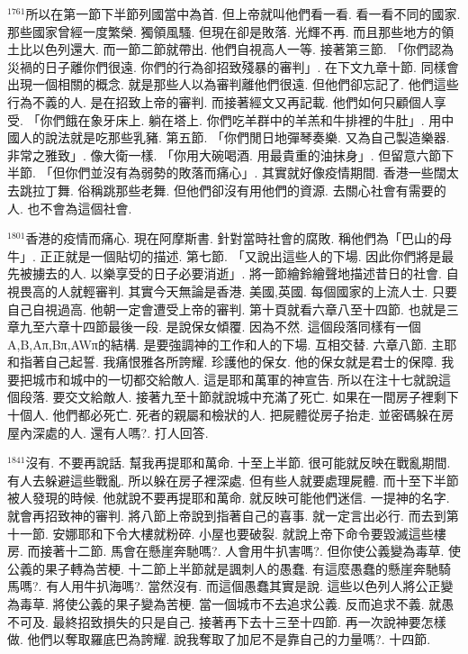 \documentclass{book}
\begin{document}
$^{1761}$所以在第一節下半節列國當中為首.
但上帝就叫他們看一看.
看一看不同的國家.
那些國家曾經一度繁榮.
獨領風騷.
但現在卻是敗落.
光輝不再.
而且那些地方的領土比以色列還大.
而一節二節就帶出.
他們自視高人一等.
接著第三節.
「你們認為災禍的日子離你們很遠.
你們的行為卻招致殘暴的審判」.
在下文九章十節.
同樣會出現一個相關的概念.
就是那些人以為審判離他們很遠.
但他們卻忘記了.
他們這些行為不義的人.
是在招致上帝的審判.
而接著經文又再記載.
他們如何只顧個人享受.
「你們餓在象牙床上.
躺在塔上.
你們吃羊群中的羊羔和牛排裡的牛肚」.
用中國人的說法就是吃那些乳豬.
第五節.
「你們閒日地彈琴奏樂.
又為自己製造樂器.
非常之雅致」.
像大衛一樣.
「你用大碗喝酒.
用最貴重的油抹身」.
但留意六節下半節.
「但你們並沒有為弱勢的敗落而痛心」.
其實就好像疫情期間.
香港一些闊太去跳拉丁舞.
俗稱跳那些老舞.
但他們卻沒有用他們的資源.
去關心社會有需要的人.
也不會為這個社會.

$^{1801}$香港的疫情而痛心.
現在阿摩斯書.
針對當時社會的腐敗.
稱他們為「巴山的母牛」.
正正就是一個貼切的描述.
第七節.
「又說出這些人的下場.
因此你們將是最先被擄去的人.
以樂享受的日子必要消逝」.
將一節繪鈴繪聲地描述昔日的社會.
自視畏高的人就輕審判.
其實今天無論是香港.
美國,英國.
每個國家的上流人士.
只要自己自視過高.
他朝一定會遭受上帝的審判.
第十頁就看六章八至十四節.
也就是三章九至六章十四節最後一段.
是說保女傾覆.
因為不然.
這個段落同樣有一個A,B,Aπ,Bπ,AWπ的結構.
是要強調神的工作和人的下場.
互相交替.
六章八節.
主耶和指著自己起誓.
我痛恨雅各所誇耀.
珍護他的保女.
他的保女就是君士的保障.
我要把城市和城中的一切都交給敵人.
這是耶和萬軍的神宣告.
所以在注十七就說這個段落.
要交文給敵人.
接著九至十節就說城中充滿了死亡.
如果在一間房子裡剩下十個人.
他們都必死亡.
死者的親屬和檢狀的人.
把屍體從房子抬走.
並密碼躲在房屋內深處的人.
還有人嗎?.
打人回答.

$^{1841}$沒有.
不要再說話.
幫我再提耶和萬命.
十至上半節.
很可能就反映在戰亂期間.
有人去躲避這些戰亂.
所以躲在房子裡深處.
但有些人就要處理屍體.
而十至下半節被人發現的時候.
他就說不要再提耶和萬命.
就反映可能他們迷信.
一提神的名字.
就會再招致神的審判.
將八節上帝說到指著自己的喜事.
就一定言出必行.
而去到第十一節.
安娜耶和下令大樓就粉碎.
小屋也要破裂.
就說上帝下命令要毀滅這些樓房.
而接著十二節.
馬會在懸崖奔馳嗎?.
人會用牛扒害嗎?.
但你使公義變為毒草.
使公義的果子轉為苦梗.
十二節上半節就是諷刺人的愚蠢.
有這麼愚蠢的懸崖奔馳騎馬嗎?.
有人用牛扒海嗎?.
當然沒有.
而這個愚蠢其實是說.
這些以色列人將公正變為毒草.
將使公義的果子變為苦梗.
當一個城市不去追求公義.
反而追求不義.
就愚不可及.
最終招致損失的只是自己.
接著再下去十三至十四節.
再一次說神要怎樣做.
他們以奪取羅底巴為誇耀.
說我奪取了加尼不是靠自己的力量嗎?.
十四節.
\end{document}
